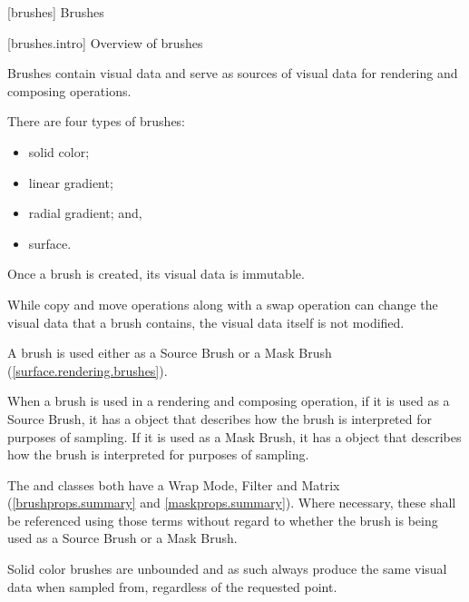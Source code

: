 
 [brushes] {Brushes}

 [brushes.intro] {Overview of brushes}

\pnum
Brushes contain visual data and serve as sources of visual data for rendering and composing operations.

\pnum
There are four types of brushes:
\begin{itemize}
	\item solid color;
	\item linear gradient;
	\item radial gradient; and,
	\item surface.
\end{itemize}

\pnum
Once a brush is created, its visual data is immutable.

\pnum
\begin{note}
While copy and move operations along with a swap operation can change the visual data that a brush contains, the visual data itself is not modified.
\end{note}

\pnum
A brush is used either as a Source Brush or a Mask Brush (\ref{surface.rendering.brushes}).

\pnum
When a brush is used in a rendering and composing operation, if it is used as a Source Brush, it has a  object that describes how the brush is interpreted for purposes of sampling. If it is used as a Mask Brush, it has a  object that describes how the brush is interpreted for purposes of sampling.

\pnum
The  and  classes both have a Wrap Mode, Filter and Matrix (\ref{brushprops.summary} and \ref{maskprops.summary}). Where necessary, these shall be referenced using those terms without regard to whether the brush is being used as a Source Brush or a Mask Brush.


%
%
%
%
%
%
\pnum
Solid color brushes are unbounded and as such always produce the same visual data when sampled from, regardless of the requested point.

